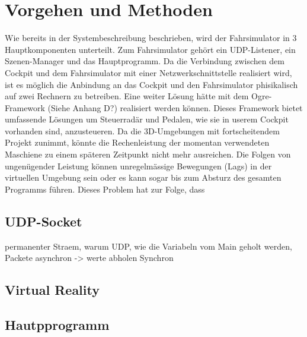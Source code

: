 \section{Vorgehen und Methoden}
Wie bereits in der Systembeschreibung beschrieben, wird der Fahrsimulator in 3 Hauptkomponenten unterteilt. Zum Fahrsimulator gehört ein UDP-Listener, ein Szenen-Manager und das Hauptprogramm. Da die Verbindung zwischen dem Cockpit und dem Fahrsimulator mit einer Netzwerkschnittstelle realisiert wird, ist es möglich die Anbindung an das Cockpit und den Fahrsimulator phisikalisch auf zwei Rechnern zu betreiben. Eine weiter Lösung hätte mit dem Ogre-Framework (Siehe Anhang D?) realisiert werden können. Dieses Framework bietet umfassende Lösungen um Steuerradär und Pedalen, wie sie in userem Cockpit vorhanden sind, anzusteueren.
Da die 3D-Umgebungen mit fortscheitendem Projekt zunimmt, könnte die Rechenleistung der momentan verwendeten Maschiene zu einem späteren Zeitpunkt nicht mehr ausreichen. Die Folgen von ungenügender Leistung können unregelmässige Bewegungen (Lags) in der virtuellen Umgebung sein oder es kann sogar bis zum Absturz des gesamten Programms führen. 
Dieses Problem hat zur Folge, dass
\subsection{UDP-Socket}
permanenter Straem, warum UDP, wie die Variabeln vom Main geholt werden, Packete asynchron -> werte abholen Synchron
\subsection{Virtual Reality}
\subsection{Hautpprogramm}





